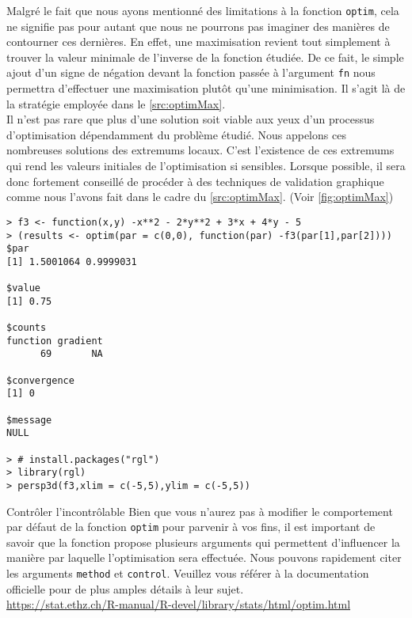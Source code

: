 \vspace{\baselineskip}
Malgré le fait que nous ayons mentionné des limitations à la fonction \texttt{optim}, cela ne signifie pas pour autant que nous ne pourrons pas imaginer des manières de contourner ces dernières. En effet, une maximisation revient tout simplement à trouver la valeur minimale de l'inverse de la fonction étudiée. De ce fait, le simple ajout d'un signe de négation devant la fonction passée à l'argument \texttt{fn} nous permettra d'effectuer une maximisation plutôt qu'une minimisation. Il s'agit là de la stratégie employée dans le \autoref{src:optimMax}. \\

Il n’est pas rare que plus d’une solution soit viable aux yeux d’un processus d’optimisation dépendamment du problème étudié. Nous appelons ces nombreuses solutions des extremums locaux. C'est l'existence de ces extremums qui rend les valeurs initiales de l'optimisation si sensibles. Lorsque possible, il sera donc fortement conseillé de procéder à des techniques de validation graphique comme nous l'avons fait dans le cadre du \autoref{src:optimMax}. (Voir \autoref{fig:optimMax}) \\

\begin{lstlisting}[caption = Maximisation d'une fonction avec \texttt{optim},label=src:optimMax]
> f3 <- function(x,y) -x**2 - 2*y**2 + 3*x + 4*y - 5
> (results <- optim(par = c(0,0), function(par) -f3(par[1],par[2])))
$par
[1] 1.5001064 0.9999031

$value
[1] 0.75

$counts
function gradient
      69       NA

$convergence
[1] 0

$message
NULL

> # install.packages("rgl")
> library(rgl)
> persp3d(f3,xlim = c(-5,5),ylim = c(-5,5))
\end{lstlisting}


\begin{moreInfo}{Contrôler l'incontrôlable}
	Bien que vous n'aurez pas à modifier le comportement par défaut de la fonction \texttt{optim} pour parvenir à vos fins, il est important de savoir que la fonction propose plusieurs arguments qui permettent d'influencer la manière par laquelle l'optimisation sera effectuée. Nous pouvons rapidement citer les arguments \texttt{method} et \texttt{control}. Veuillez vous référer à la documentation officielle pour de plus amples détails à leur sujet. \\
	\url{https://stat.ethz.ch/R-manual/R-devel/library/stats/html/optim.html}
\end{moreInfo}

